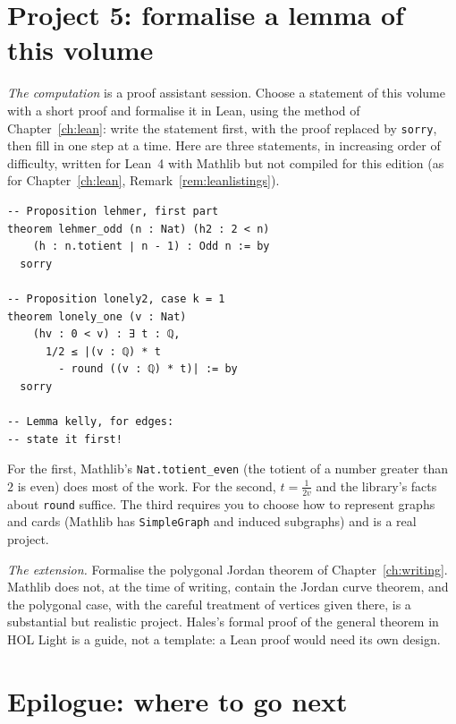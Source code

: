 \section{Project 5: formalise a lemma of this volume}

\emph{The computation} is a proof assistant session. Choose a statement of this volume with a short proof and formalise it in Lean, using the method of Chapter~\ref{ch:lean}: write the statement first, with the proof replaced by \texttt{sorry}, then fill in one step at a time. Here are three statements, in increasing order of difficulty, written for Lean~4 with Mathlib but not compiled for this edition (as for Chapter~\ref{ch:lean}, Remark~\ref{rem:leanlistings}).
\begin{verbatim}
-- Proposition lehmer, first part
theorem lehmer_odd (n : Nat) (h2 : 2 < n)
    (h : n.totient ∣ n - 1) : Odd n := by
  sorry

-- Proposition lonely2, case k = 1
theorem lonely_one (v : Nat)
    (hv : 0 < v) : ∃ t : ℚ,
      1/2 ≤ |(v : ℚ) * t
        - round ((v : ℚ) * t)| := by
  sorry

-- Lemma kelly, for edges:
-- state it first!
\end{verbatim}
For the first, Mathlib's \texttt{Nat.totient\_even} (the totient of a number greater than $2$ is even) does most of the work. For the second, $t=\frac1{2v}$ and the library's facts about \texttt{round} suffice. The third requires you to choose how to represent graphs and cards (Mathlib has \texttt{SimpleGraph} and induced subgraphs) and is a real project.

\emph{The extension.} Formalise the polygonal Jordan theorem of Chapter~\ref{ch:writing}. Mathlib does not, at the time of writing, contain the Jordan curve theorem, and the polygonal case, with the careful treatment of vertices given there, is a substantial but realistic project. Hales's formal proof of the general theorem in HOL Light is a guide, not a template: a Lean proof would need its own design.

\section{Epilogue: where to go next}

